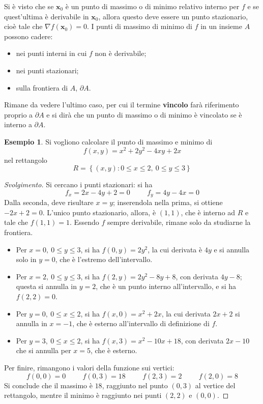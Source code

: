 \documentclass[11pt, a4paper]{scrartcl}
\newenvironment{svolgimento}{\renewcommand\qedsymbol{$\blacksquare$}\begin{proof}[Svolgimento]}{\end{proof}}
\theoremstyle{definition}
\newtheorem{esempio}{Esempio}
\numberwithin{esempio}{section}
\theoremstyle{definition}
\numberwithin{obs}{section}
\numberwithin{nota}{section}
\numberwithin{equation}{subsection}
\begin{document}
Si \`e visto che se $\mathbf{x}_0 $ \`e un punto di massimo o di minimo relativo interno per $f$ e se quest'ultima \`e derivabile in $\mathbf{x} _0$, allora questo deve essere un punto stazionario, cio\`e tale che $\nabla f(\mathbf{x} _0) = 0$.
I punti di massimo di minimo di $f$ in un insieme $A$ possono cadere:
\begin{itemize}
	\item nei punti interni in cui $f$ non \`e derivabile;
	\item nei punti stazionari;
	\item sulla frontiera di $A$, $\partial A$.
\end{itemize}
Rimane da vedere l'ultimo caso, per cui il termine \textbf{vincolo} far\`a riferimento proprio a $\partial A$ e si dir\`a che un punto di massimo o di minimo \`e vincolato se \`e interno a $\partial A$.
\begin{esempio}
	Si vogliono calcolare il punto di massimo e minimo di
	\[
	f(x,y) = x^2 + 2y^2 - 4xy + 2x
	\] 
	nel rettangolo 
	\[
	R = \left\{ (x,y) : 0\le x\le 2 , \ 0\le y \le 3 \right\} 
	\] 
	\begin{svolgimento}
		Si cercano i punti stazionari: si ha
		\[
		f_x = 2x - 4y + 2 = 0 \hspace{1cm}f_y = 4y -4x = 0
		\] 
		Dalla seconda, deve risultare $x=y$; inserendola nella prima, si ottiene $-2x + 2 =0$. 
		L'unico punto stazionario, allora, \`e $(1,1)$, che \`e interno ad $R$ e tale che $f(1,1) = 1$.
		Essendo $f$ sempre derivabile, rimane solo da studiarne la frontiera.
		\begin{itemize}
			\item Per $x = 0, \ 0\le y\le 3$, si ha $f(0,y) = 2y^2$, la cui derivata \`e $4y$ e si annulla solo in $y=0$, che \`e l'estremo dell'intervallo.
			\item Per $x=2, \ 0\le y\le 3$, si ha $f(2,y) = 2y^2 - 8y +8$, con derivata $4y-8$; questa si annulla in $y=2$, che \`e un punto interno all'intervallo, e si ha $f(2,2) = 0$.
			\item Per $y=0, \ 0\le x\le 2$, si ha $f(x,0) = x^2 + 2x$, la cui derivata $2x+2$ si annulla in $x=-1$, che \`e esterno all'intervallo di definizione di $f$.
			\item Per $y=3, \ 0\le x\le 2$, si ha $f(x,3) = x^2 -10x+18$, con derivata $2x-10$ che si annulla per $x=5$, che \`e esterno.
		\end{itemize}
		Per finire, rimangono i valori della funzione sui vertici:
		\[
		f(0,0) = 0 \hspace{1cm} f(0,3) = 18 \hspace{1cm} f(2,3) = 2 \hspace{1cm} f(2,0) = 8
		\] 
		Si conclude che il massimo \`e $18$, raggiunto nel punto $(0,3)$ al vertice del rettangolo, mentre il minimo \`e raggiunto nei punti $(2,2)$ e $(0,0)$.
	\end{svolgimento}
\end{esempio}
\end{document}
